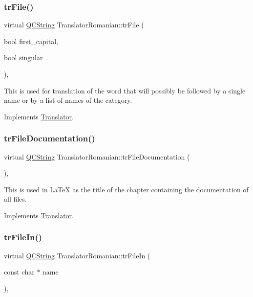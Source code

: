 \subsubsection{\texorpdfstring{trFile()}{trFile()}}
{\footnotesize\ttfamily virtual \mbox{\hyperlink{class_q_c_string}{Q\+C\+String}} Translator\+Romanian\+::tr\+File (\begin{DoxyParamCaption}\item[{bool}]{first\+\_\+capital,  }\item[{bool}]{singular }\end{DoxyParamCaption})\hspace{0.3cm}{\ttfamily [inline]}, {\ttfamily [virtual]}}

This is used for translation of the word that will possibly be followed by a single name or by a list of names of the category. 

Implements \mbox{\hyperlink{class_translator}{Translator}}.

\mbox{\label{class_translator_romanian_a3b7c6f16935f1dd0c8b1bf088fbe3ddb}} 
\subsubsection{\texorpdfstring{trFileDocumentation()}{trFileDocumentation()}}
{\footnotesize\ttfamily virtual \mbox{\hyperlink{class_q_c_string}{Q\+C\+String}} Translator\+Romanian\+::tr\+File\+Documentation (\begin{DoxyParamCaption}{ }\end{DoxyParamCaption})\hspace{0.3cm}{\ttfamily [inline]}, {\ttfamily [virtual]}}

This is used in La\+TeX as the title of the chapter containing the documentation of all files. 

Implements \mbox{\hyperlink{class_translator}{Translator}}.

\mbox{\label{class_translator_romanian_a119498b104aae1c9345e7c346eedf125}} 
\subsubsection{\texorpdfstring{trFileIn()}{trFileIn()}}
{\footnotesize\ttfamily virtual \mbox{\hyperlink{class_q_c_string}{Q\+C\+String}} Translator\+Romanian\+::tr\+File\+In (\begin{DoxyParamCaption}\item[{const char $\ast$}]{name }\end{DoxyParamCaption})\hspace{0.3cm}{\ttfamily [inline]}, {\ttfamily [virtual]}}

